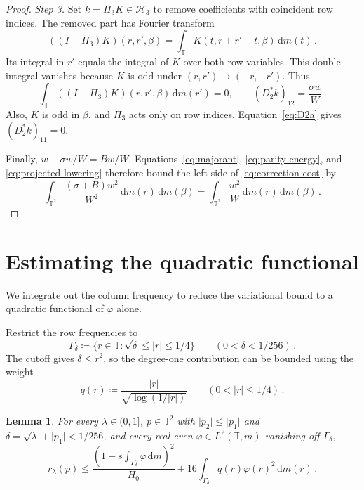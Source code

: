 \documentclass[11pt]{amsart}
\theoremstyle{plain}
\newtheorem{lemma}[theorem]{Lemma}
\theoremstyle{definition}
\newcommand{\T}{\mathbb T}
\newcommand{\1}{\mathbf 1}
\newcommand{\abs}[1]{\lvert #1\rvert}
\newcommand{\dd}{\,\mathrm d}
\newcommand{\Hs}{\mathcal H}
\begin{document}
\begin{proof}
		\medskip
		\noindent\emph{Step 3.}
		Set $k=\Pi_3K\in\Hs_3$ to remove coefficients with coincident row indices.
		The removed part has Fourier transform
		\[
		((I-\Pi_3)K)(r,r',\beta)
		=\int_\T K(t,r+r'-t,\beta)\dd m(t)\, .
		\]
		Its integral in $r'$ equals the integral of $K$ over both row variables.
		This double integral vanishes because $K$ is odd under
		$(r,r')\mapsto(-r,-r')$.  Thus
		\begin{equation}\label{eq:projected-lowering}
			\int_\T((I-\Pi_3)K)(r,r',\beta)\dd m(r')=0,
			\qquad (D_2^*k)_{12}=\frac{\sigma w}{W}\, .
		\end{equation}
		Also, $K$ is odd in $\beta$, and $\Pi_3$ acts only on row indices.
		Equation~\eqref{eq:D2a} gives $(D_2^*k)_{11}=0$.
		
		Finally, $w-\sigma w/W=Bw/W$.
		Equations~\eqref{eq:majorant}, \eqref{eq:parity-energy}, and
		\eqref{eq:projected-lowering} therefore bound the left side of
		\eqref{eq:correction-cost} by
		\[
		\int_{\T^2}\frac{(\sigma+B)w^2}{W^2}\dd m(r)\dd m(\beta)
		=\int_{\T^2}\frac{w^2}{W}\dd m(r)\dd m(\beta)\, .
		\]
	\end{proof}
	
	\section{Estimating the quadratic functional}\label{sec:effective-energy}
	
	We integrate out the column frequency to reduce the variational bound
	to a quadratic functional of $\varphi$ alone.
	
	Restrict the row frequencies to
	\begin{equation}\label{eq:Gamma-q}
		\Gamma_\delta\coloneqq
		\{r\in\T:\sqrt\delta\leq\abs r\leq1/4\}
		\qquad(0<\delta<1/256)\, .
	\end{equation}
	The cutoff gives $\delta\leq r^2$, so the degree-one contribution can
	be bounded using the weight
	\begin{equation}\label{eq:q}
		q(r)\coloneqq\frac{\abs r}{\sqrt{\log(1/\abs r)}}
		\qquad(0<\abs r\leq1/4)\, .
	\end{equation}
	
	\begin{lemma}\label{lem:effective-energy}
		For every
		$\lambda\in(0,1]$, $p\in\T^2$ with
		$\abs{p_2}\leq\abs{p_1}$ and
		$\delta=\sqrt\lambda+\abs{p_1}<1/256$, and every real even
		$\varphi\in L^2(\T,m)$ vanishing off $\Gamma_\delta$,
		\begin{equation}\label{eq:effective-energy}
			r_\lambda(p)\leq
			\frac{\left(1-s\int_{\Gamma_\delta}\varphi\dd m\right)^2}{H_0}
			+16\int_{\Gamma_\delta}q(r)\varphi(r)^2\dd m(r)\, .
		\end{equation}
	\end{lemma}
	
\end{document}
